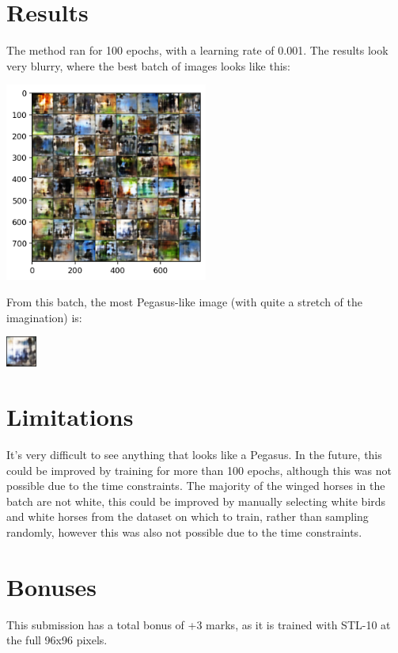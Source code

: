 \documentclass{article}
\begin{document}
\section{Results}
The method ran for 100 epochs, with a learning rate of 0.001. 
The results look very blurry, where the best batch of images looks like this:
\begin{center}
    \includegraphics[width=0.5\textwidth]{figures/best-batch.png}
\end{center}
From this batch, the most Pegasus-like image (with quite a stretch of the imagination) is:
\begin{center}
    \includegraphics[width=0.075\textwidth]{figures/best-pegasus.png}
\end{center}

\section{Limitations}
It's very difficult to see anything that looks like a Pegasus. 
In the future, this could be improved by training for more than 100 epochs, 
although this was not possible due to the time constraints. 
The majority of the winged horses in the batch are not white, this could be improved by manually selecting white birds 
and white horses from the dataset on which to train, rather than sampling randomly, 
however this was also not possible due to the time constraints. 

\section*{Bonuses}
This submission has a total bonus of +3 marks, as it is trained with STL-10 at the full 96x96 pixels.

\printbibliography
\end{document}

